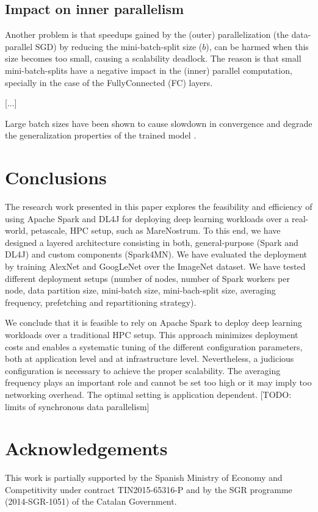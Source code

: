 \documentclass[journal]{IEEEtran}
\begin{document}
\subsection{Impact on inner parallelism}

Another problem is that speedups gained by the (outer) parallelization (the data-parallel SGD) by reducing the mini-batch-split size ($b$), can be harmed when this size becomes too small, causing a scalability deadlock. The reason is that small mini-batch-splits have a negative impact in the (inner) parallel computation, specially in the case of the FullyConnected (FC) layers.

[...]  


Large batch sizes have been shown to cause slowdown in convergence and degrade the generalization properties of the trained model \cite{DBLP:journals/corr/abs-1708-05256}. 


\section{Conclusions}
The research work presented in this paper explores the feasibility and efficiency of using Apache Spark and DL4J for 
deploying deep learning workloads over a real-world, petascale, HPC setup, such as MareNostrum.
To this end, we have designed a layered architecture consisting in both, general-purpose (Spark and DL4J) and custom components (Spark4MN). 
We have evaluated the deployment by training AlexNet and GoogLeNet over the ImageNet dataset. We have tested different deployment setups (number of nodes, number of Spark workers per node, data partition size, mini-batch size, mini-bach-split size, averaging frequency, prefetching and repartitioning strategy).  

We conclude that it is feasible to rely on Apache Spark to deploy deep learning workloads over a traditional HPC setup. This approach minimizes deployment costs and enables a systematic tuning of the different configuration parameters, both at application level and at infrastructure level. Nevertheless, a judicious configuration is necessary to achieve the proper scalability. The averaging frequency plays an important role and cannot be set too high or it may imply too networking overhead. The optimal setting is application dependent. [TODO: limits of synchronous data parallelism]


\section*{Acknowledgements}
This work is partially supported by the Spanish Ministry of Economy and Competitivity under contract TIN2015-65316-P and by the SGR programme (2014-SGR-1051) of the Catalan Government.
\end{document}
